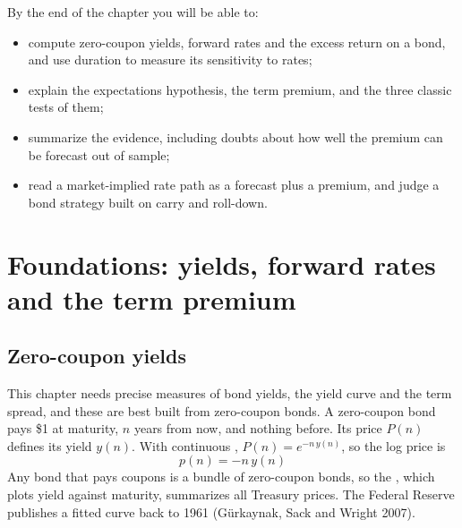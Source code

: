 By the end of the chapter you will be able to:

\begin{itemize}
  \item compute zero-coupon yields, forward rates and the excess return on a bond, and use duration to measure its sensitivity to rates;
  \item explain the expectations hypothesis, the term premium, and the three classic tests of them;
  \item summarize the evidence, including doubts about how well the premium can be forecast out of sample;
  \item read a market-implied rate path as a forecast plus a premium, and judge a bond strategy built on carry and roll-down.
\end{itemize}


\section{Foundations: yields, forward rates and the term premium}
\label{sec:07-foundations}

\subsection{Zero-coupon yields}

This chapter needs precise measures of bond yields, the yield curve and the term spread, and these are best built from zero-coupon bonds. A zero-coupon bond pays \$1 at maturity, $n$ years from now, and nothing before. Its price $P(n)$ defines its yield $y(n)$. With continuous , $P(n) = e^{-n\,y(n)}$, so the log price is
\begin{equation}
  p(n) = -n\,y(n)
  \label{eq:07-logprice}
\end{equation}
Any bond that pays coupons is a bundle of zero-coupon bonds, so the , which plots yield against maturity, summarizes all Treasury prices. The Federal Reserve publishes a fitted curve back to 1961 (G\"urkaynak, Sack and Wright 2007).


